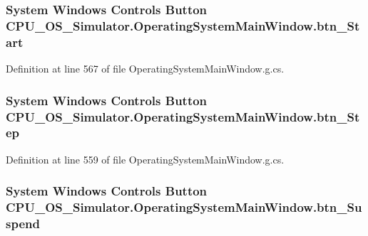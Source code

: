 \subsubsection[{btn\+\_\+\+Start}]{\setlength{\rightskip}{0pt plus 5cm}System Windows Controls Button C\+P\+U\+\_\+\+O\+S\+\_\+\+Simulator.\+Operating\+System\+Main\+Window.\+btn\+\_\+\+Start\hspace{0.3cm}{\ttfamily [package]}}\label{class_c_p_u___o_s___simulator_1_1_operating_system_main_window_a811cecc7b1fa49c7f340be7377ff7f32}


Definition at line 567 of file Operating\+System\+Main\+Window.\+g.\+cs.

\hypertarget{class_c_p_u___o_s___simulator_1_1_operating_system_main_window_aa7fab2cb43aa4eefed8e3bcba47a539b}{}
\subsubsection[{btn\+\_\+\+Step}]{\setlength{\rightskip}{0pt plus 5cm}System Windows Controls Button C\+P\+U\+\_\+\+O\+S\+\_\+\+Simulator.\+Operating\+System\+Main\+Window.\+btn\+\_\+\+Step\hspace{0.3cm}{\ttfamily [package]}}\label{class_c_p_u___o_s___simulator_1_1_operating_system_main_window_aa7fab2cb43aa4eefed8e3bcba47a539b}


Definition at line 559 of file Operating\+System\+Main\+Window.\+g.\+cs.

\hypertarget{class_c_p_u___o_s___simulator_1_1_operating_system_main_window_abb2c3824f2ed103814e81c8a6bf5452e}{}
\subsubsection[{btn\+\_\+\+Suspend}]{\setlength{\rightskip}{0pt plus 5cm}System Windows Controls Button C\+P\+U\+\_\+\+O\+S\+\_\+\+Simulator.\+Operating\+System\+Main\+Window.\+btn\+\_\+\+Suspend\hspace{0.3cm}{\ttfamily [package]}}\label{class_c_p_u___o_s___simulator_1_1_operating_system_main_window_abb2c3824f2ed103814e81c8a6bf5452e}


